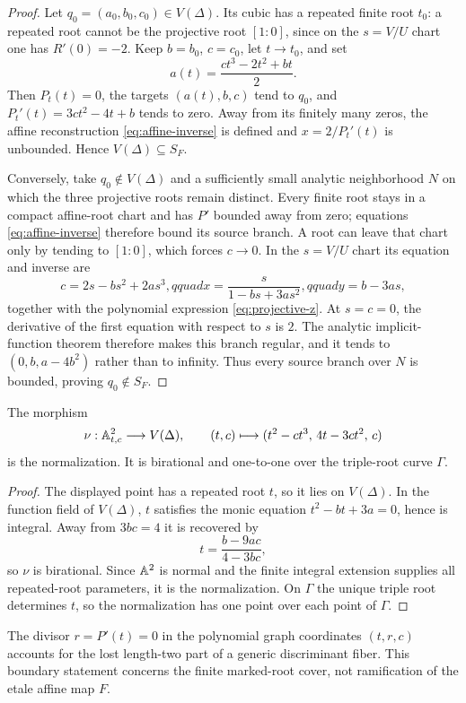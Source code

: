 \begin{proof}
Let $q_0=(a_0,b_0,c_0)\in V(\Delta)$.  Its cubic has a repeated finite root
$t_0$: a repeated root cannot be the projective root $[1:0]$, since on the
$s=V/U$ chart one has $R'(0)=-2$.  Keep $b=b_0$, $c=c_0$, let $t\to t_0$,
and set
\[
 a(t)=\frac{ct^3-2t^2+bt}{2}.
\]
Then $P_t(t)=0$, the targets $(a(t),b,c)$ tend to $q_0$, and
$P_t'(t)=3ct^2-4t+b$ tends to zero.  Away from its finitely many zeros,
the affine reconstruction \eqref{eq:affine-inverse} is defined and
$x=2/P_t'(t)$ is unbounded.  Hence $V(\Delta)\subseteq S_F$.

Conversely, take $q_0\notin V(\Delta)$ and a sufficiently small analytic
neighborhood $N$ on which the three projective roots remain distinct.  Every
finite root stays in a compact affine-root chart and has $P'$ bounded away
from zero; equations \eqref{eq:affine-inverse} therefore bound its source
branch.  A root can leave that chart only by tending to $[1:0]$, which forces
$c\to0$.  In the $s=V/U$ chart its equation and inverse are
\[
 c=2s-bs^2+2as^3,qquad
 x=\frac{s}{1-bs+3as^2},qquad y=b-3as,
\]
together with the polynomial expression \eqref{eq:projective-z}.  At
$s=c=0$, the derivative of the first equation with respect to $s$ is $2$.
The analytic implicit-function theorem therefore makes this branch regular,
and it tends to $(0,b,a-4b^2)$ rather than to infinity.  Thus every source
branch over $N$ is bounded, proving $q_0\notin S_F$.
\end{proof}

\begin{proposition}\label{prop:disc-normalization}
The morphism
\[
 \nu:\mathbb A^2_{t,c}\longrightarrow V(\Delta),\qquad
 (t,c)\longmapsto(t^2-ct^3,\,4t-3ct^2,\,c)
\]
is the normalization.  It is birational and one-to-one over the triple-root
curve $\Gamma$.
\end{proposition}

\begin{proof}
The displayed point has a repeated root $t$, so it lies on $V(\Delta)$.
In the function field of $V(\Delta)$, $t$ satisfies the monic equation
$t^2-bt+3a=0$, hence is integral.  Away from $3bc=4$ it is recovered by
\[
 t=\frac{b-9ac}{4-3bc},
\]
so $\nu$ is birational.  Since $\mathbb A^2$ is normal and the finite integral
extension supplies all repeated-root parameters, it is the normalization.
On $\Gamma$ the unique triple root determines $t$, so the normalization has
one point over each point of $\Gamma$.
\end{proof}

The divisor $r=P'(t)=0$ in the polynomial graph coordinates
$(t,r,c)$ accounts for the lost length-two part of a generic discriminant
fiber.  This boundary statement concerns the finite marked-root cover, not
ramification of the etale affine map $F$.
